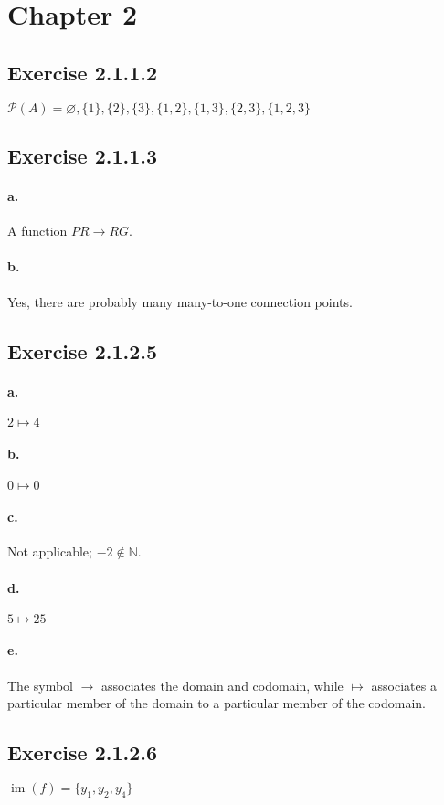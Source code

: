 \documentclass[14pt]{article}
\let\emptyset\varnothing{}
\begin{document}
\section*{Chapter 2}

\subsection*{Exercise 2.1.1.2}
$\mathcal{P}(A) = \emptyset, \{1\}, \{2\}, \{3\}, \{1,2\}, \{1,3\}, \{2,3\}, \{1,2,3\}$

\subsection*{Exercise 2.1.1.3}
\paragraph{a.}
A function $PR \to RG$.
\paragraph{b.}
Yes, there are probably many many-to-one connection points.

\subsection*{Exercise 2.1.2.5}
\paragraph{a.}
$2 \mapsto 4$
\paragraph{b.}
$0 \mapsto 0$
\paragraph{c.}
Not applicable; $-2 \not\in \mathbb{N}$.
\paragraph{d.}
$5 \mapsto 25$
\paragraph{e.}
The symbol $\to$ associates the domain and codomain, while $\mapsto$
associates a particular member of the domain to a particular member of
the codomain.

\subsection*{Exercise 2.1.2.6}
$\operatorname{im}(f) = \{y_1, y_2, y_4\}$
\end{document}
